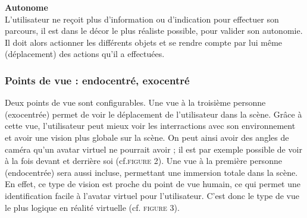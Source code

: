 \textbf{Autonome}
\\

L'utilisateur ne reçoit plus d'information ou d'indication pour effectuer son parcours, il est dans le décor le plus réaliste possible, pour valider son autonomie. Il doit alors actionner les différents objets et se rendre compte par lui même (déplacement) des actions qu'il a effectuées.

\subsubsection{Points de vue : endocentré, exocentré}

Deux points de vue sont configurables. Une vue à la troisième personne (exocentrée) permet de voir le déplacement de l'utilisateur dans la scène.
Grâce à cette vue, l'utilisateur peut mieux voir les interractions avec son environnement et avoir une vision plus globale sur la scène. 
On peut ainsi avoir des angles de caméra qu'un avatar virtuel ne pourrait avoir ; il est par exemple possible de voir à la fois devant et derrière soi (cf.\textsc{figure 2}).
\newline
Une vue à la première personne (endocentrée) sera aussi incluse, permettant une immersion totale dans la scène. 
En effet, ce type de vision est proche du point de vue humain, ce qui permet une identification facile à l'avatar virtuel pour l'utilisateur. C'est donc le type de vue le plus logique en réalité virtuelle (cf. \textsc{figure 3}).
